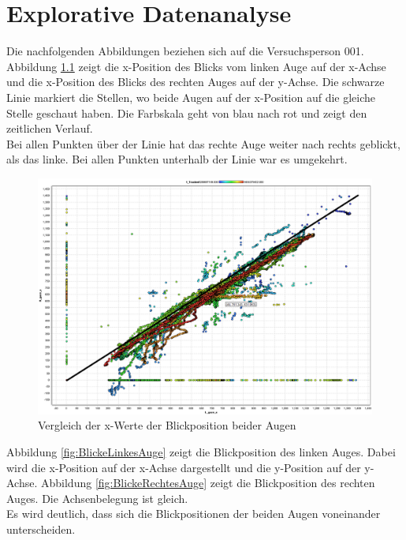 \chapter{Explorative Datenanalyse}
Die nachfolgenden Abbildungen beziehen sich auf die Versuchsperson 001.\\
Abbildung \ref{fig:AugenX-Positionen} zeigt die x-Position des Blicks vom linken Auge auf der x-Achse und die x-Position des Blicks des rechten Auges auf der y-Achse. Die schwarze Linie markiert die Stellen, wo beide Augen auf der x-Position auf die gleiche Stelle geschaut haben. Die Farbskala geht von blau nach rot und zeigt den zeitlichen Verlauf.\\
Bei allen Punkten \"uber der Linie hat das rechte Auge weiter nach rechts geblickt, als das linke. Bei allen Punkten unterhalb der Linie war es umgekehrt.

\begin{figure}[H]
	\noindent \begin{centering}
		\includegraphics[width=15cm]{pics/Augen-X-Positionen.png}
		\par\end{centering}
	\caption{\label{fig:AugenX-Positionen}Vergleich der x-Werte der Blickposition beider Augen \cite{BilderExplorativeDatenanalyseBoersch}}
\end{figure}

Abbildung \ref{fig:BlickeLinkesAuge} zeigt die Blickposition des linken Auges. Dabei wird die x-Position auf der x-Achse dargestellt und die y-Position auf der y-Achse. Abbildung \ref{fig:BlickeRechtesAuge} zeigt die Blickposition des rechten Auges. Die Achsenbelegung ist gleich.\\
Es wird deutlich, dass sich die Blickpositionen der beiden Augen voneinander unterscheiden.

